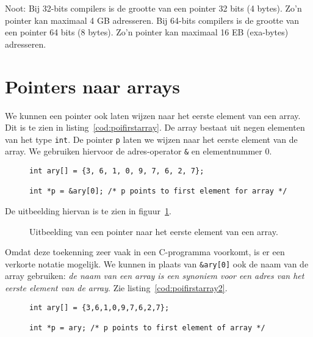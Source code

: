 Noot: Bij 32-bits compilers is de grootte van een pointer 32 bits (4 bytes). Zo'n pointer kan maximaal 4 GB adresseren. Bij 64-bits compilers is de grootte van een pointer 64 bits (8 bytes). Zo'n pointer kan maximaal 16 EB (exa-bytes) adresseren.


\section{Pointers naar arrays}
\label{sec:pointersnaararrays}
We kunnen een pointer ook laten wijzen naar het eerste element van een array. Dit is te zien in listing~\ref{cod:poifirstarray}. De array bestaat uit negen elementen van het type \texttt{int}. De pointer \texttt{p} laten we wijzen naar het eerste element van de array. We gebruiken hiervoor de adres-operator \texttt{\&} en elementnummer 0.

\begin{figure}[!ht]
\begin{lstlisting}[caption=Een pointer naar het eerste element van een array.,label=cod:poifirstarray]
int ary[] = {3, 6, 1, 0, 9, 7, 6, 2, 7};

int *p = &ary[0]; /* p points to first element for array */
\end{lstlisting}
\end{figure}

De uitbeelding hiervan is te zien in figuur~\ref{fig:poifirstarray}.
%
\begin{figure}[!ht]
\centering
{}
\caption{Uitbeelding van een pointer naar het eerste element van een array.}
\label{fig:poifirstarray}
\end{figure}
%
Omdat deze toekenning zeer vaak in een C-programma voorkomt, is er een verkorte notatie mogelijk. We kunnen in plaats van \texttt{\&ary[0]} ook de naam van de array gebruiken: \textsl{de naam van een array is een synoniem voor een adres van het eerste element van de array}. Zie listing~\ref{cod:poifirstarray2}.

\begin{figure}[!ht]
\begin{lstlisting}[caption=Een pointer naar het eerste element van een array.,label=cod:poifirstarray2]
int ary[] = {3,6,1,0,9,7,6,2,7};

int *p = ary; /* p points to first element of array */
\end{lstlisting}
\end{figure}

